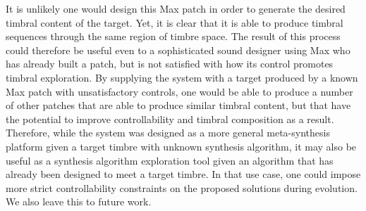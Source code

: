 \documentclass[12pt]{report} 	%
\numberwithin{figure}{chapter}
\numberwithin{table}{chapter}
\numberwithin{equation}{chapter}
\begin{document}
\begin{flushleft}
It is unlikely one would design this Max patch in order to generate the desired timbral content of the target. Yet, it is clear that it is able to produce timbral sequences through the same region of timbre space. The result of this process could therefore be useful even to a sophisticated sound designer using Max who has already built a patch, but is not satisfied with how its control promotes timbral exploration. By supplying the system with a target produced by a known Max patch with unsatisfactory controls, one would be able to produce a number of other patches that are able to produce similar timbral content, but that have the potential to improve controllability and timbral composition as a result. Therefore, while the system was designed as a more general meta-synthesis platform given a target timbre with unknown synthesis algorithm, it may also be useful as a synthesis algorithm exploration tool given an algorithm that has already been designed to meet a target timbre. In that use case, one could impose more strict controllability constraints on the proposed solutions during evolution. We also leave this to future work.

\clearpage

\end{flushleft}
\end{document}
